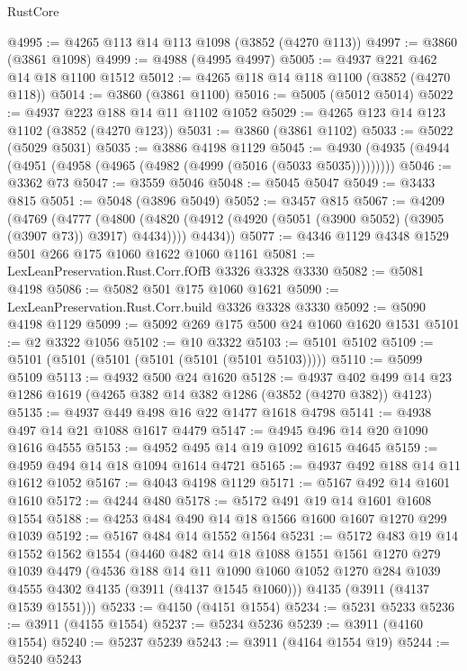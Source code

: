 \begin{lexlean}{RustCore}
\begin{coremodule}
@4995 := @4265 @113 @14 @113 @1098 (@3852 (@4270 @113))
@4997 := @3860 (@3861 @1098)
@4999 := @4988 (@4995 @4997)
@5005 := @4937 @221 @462 @14 @18 @1100 @1512
@5012 := @4265 @118 @14 @118 @1100 (@3852 (@4270 @118))
@5014 := @3860 (@3861 @1100)
@5016 := @5005 (@5012 @5014)
@5022 := @4937 @223 @188 @14 @11 @1102 @1052
@5029 := @4265 @123 @14 @123 @1102 (@3852 (@4270 @123))
@5031 := @3860 (@3861 @1102)
@5033 := @5022 (@5029 @5031)
@5035 := @3886 @4198 @1129
@5045 := @4930 (@4935 (@4944 (@4951 (@4958 (@4965 (@4982 (@4999 (@5016 (@5033 @5035)))))))))
@5046 := @3362 @73
@5047 := @3559 @5046
@5048 := @5045 @5047
@5049 := @3433 @815
@5051 := @5048 (@3896 @5049)
@5052 := @3457 @815
@5067 := @4209
    (@4769
      (@4777
        (@4800 (@4820 (@4912 (@4920 (@5051 (@3900 @5052) (@3905 (@3907 @73)) @3917) @4434))))
        @4434))
@5077 := @4346 @1129 @4348 @1529 @501 @266 @175 @1060 @1622 @1060 @1161
@5081 := LexLeanPreservation.Rust.Corr.fOfB @3326 @3328 @3330
@5082 := @5081 @4198
@5086 := @5082 @501 @175 @1060 @1621
@5090 := LexLeanPreservation.Rust.Corr.build @3326 @3328 @3330
@5092 := @5090 @4198 @1129
@5099 := @5092 @269 @175 @500 @24 @1060 @1620 @1531
@5101 := @2 @3322 @1056
@5102 := @10 @3322
@5103 := @5101 @5102
@5109 := @5101 (@5101 (@5101 (@5101 (@5101 (@5101 @5103)))))
@5110 := @5099 @5109
@5113 := @4932 @500 @24 @1620
@5128 := @4937 @402 @499 @14 @23 @1286 @1619 (@4265 @382 @14 @382 @1286 (@3852 (@4270 @382)) @4123)
@5135 := @4937 @449 @498 @16 @22 @1477 @1618 @4798
@5141 := @4938 @497 @14 @21 @1088 @1617 @4479
@5147 := @4945 @496 @14 @20 @1090 @1616 @4555
@5153 := @4952 @495 @14 @19 @1092 @1615 @4645
@5159 := @4959 @494 @14 @18 @1094 @1614 @4721
@5165 := @4937 @492 @188 @14 @11 @1612 @1052
@5167 := @4043 @4198 @1129
@5171 := @5167 @492 @14 @1601 @1610
@5172 := @4244 @480
@5178 := @5172 @491 @19 @14 @1601 @1608 @1554
@5188 := @4253 @484 @490 @14 @18 @1566 @1600 @1607 @1270 @299 @1039
@5192 := @5167 @484 @14 @1552 @1564
@5231 := @5172
    @483
    @19
    @14
    @1552
    @1562
    @1554
    (@4460
      @482
      @14
      @18
      @1088
      @1551
      @1561
      @1270
      @279
      @1039
      @4479
      (@4536
        @188
        @14
        @11
        @1090
        @1060
        @1052
        @1270
        @284
        @1039
        @4555
        @4302
        @4135
        (@3911 (@4137 @1545 @1060)))
      @4135
      (@3911 (@4137 @1539 @1551)))
@5233 := @4150 (@4151 @1554)
@5234 := @5231 @5233
@5236 := @3911 (@4155 @1554)
@5237 := @5234 @5236
@5239 := @3911 (@4160 @1554)
@5240 := @5237 @5239
@5243 := @3911 (@4164 @1554 @19)
@5244 := @5240 @5243

\end{coremodule}
\end{lexlean}
